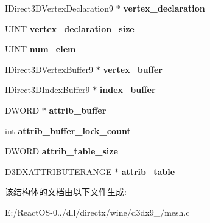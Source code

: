 \begin{DoxyCompactItemize}
I\+Direct3\+D\+Vertex\+Declaration9 $\ast$ {\bfseries vertex\+\_\+declaration}
\item 
\mbox{\label{structd3dx9__mesh_a73f57756911d24627d870ea5d3fab33e}} 
U\+I\+NT {\bfseries vertex\+\_\+declaration\+\_\+size}
\item 
\mbox{\label{structd3dx9__mesh_a4b4c6a872b2dc5a491b228815136a403}} 
U\+I\+NT {\bfseries num\+\_\+elem}
\item 
\mbox{\label{structd3dx9__mesh_a9271e2308e425a53af2c0a71bfd8f869}} 
I\+Direct3\+D\+Vertex\+Buffer9 $\ast$ {\bfseries vertex\+\_\+buffer}
\item 
\mbox{\label{structd3dx9__mesh_ac1dabbf8a17d77520e717fb0098a3c06}} 
I\+Direct3\+D\+Index\+Buffer9 $\ast$ {\bfseries index\+\_\+buffer}
\item 
\mbox{\label{structd3dx9__mesh_ab24d5bbe223fd75db2c21ea1b7878372}} 
D\+W\+O\+RD $\ast$ {\bfseries attrib\+\_\+buffer}
\item 
\mbox{\label{structd3dx9__mesh_a1361fb1502f67d5eed64fa48983857b8}} 
int {\bfseries attrib\+\_\+buffer\+\_\+lock\+\_\+count}
\item 
\mbox{\label{structd3dx9__mesh_ac1afc3f5cf5861e5cf4607d6e4318832}} 
D\+W\+O\+RD {\bfseries attrib\+\_\+table\+\_\+size}
\item 
\mbox{\label{structd3dx9__mesh_a509ea8a7b267f15ac28fe543eb73dc8c}} 
\hyperlink{struct___d3_d_x_a_t_t_r_i_b_u_t_e_r_a_n_g_e}{D3\+D\+X\+A\+T\+T\+R\+I\+B\+U\+T\+E\+R\+A\+N\+GE} $\ast$ {\bfseries attrib\+\_\+table}
\end{DoxyCompactItemize}


该结构体的文档由以下文件生成\+:\begin{DoxyCompactItemize}
\item 
E\+:/\+React\+O\+S-\/0../dll/directx/wine/d3dx9\+\_/mesh.\+c\end{DoxyCompactItemize}
